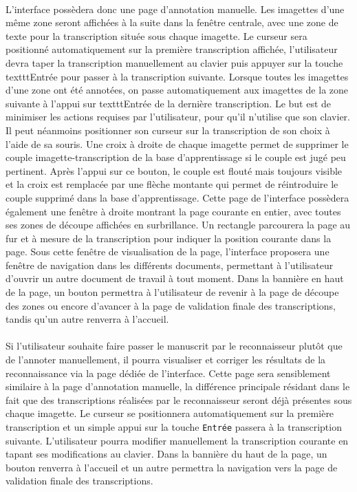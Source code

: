 \paragraph{}
L’interface possèdera donc une page d’annotation manuelle. Les imagettes d’une même zone seront affichées à la suite dans la fenêtre centrale, avec une zone de texte pour la transcription située sous chaque imagette. Le curseur sera positionné automatiquement sur la première transcription affichée, l’utilisateur devra taper la transcription manuellement au clavier puis appuyer sur la touche texttt{Entrée} pour passer à la transcription suivante. Lorsque toutes les imagettes d’une zone ont été annotées, on passe automatiquement aux imagettes de la zone suivante à l’appui sur texttt{Entrée} de la dernière transcription. Le but est de minimiser les actions requises par l’utilisateur, pour qu’il n’utilise que son clavier. Il peut néanmoins positionner son curseur sur la transcription de son choix à l’aide de sa souris.
Une croix à droite de chaque imagette permet de supprimer le couple imagette-transcription de la base d’apprentissage si le couple est jugé peu pertinent. Après l’appui sur ce bouton, le couple est flouté mais toujours visible et la croix est remplacée par une flèche montante qui permet de réintroduire le couple supprimé dans la base d’apprentissage.
Cette page de l’interface possèdera également une fenêtre à droite montrant la page courante en entier, avec toutes ses zones de découpe affichées en surbrillance. Un rectangle parcourera la page au fur et à mesure de la transcription pour indiquer la position courante dans la page.
Sous cette fenêtre de visualisation de la page, l’interface proposera une fenêtre de navigation dans les différents documents, permettant à l’utilisateur d’ouvrir un autre document de travail à tout moment.
Dans la bannière en haut de la page, un bouton permettra à l’utilisateur de revenir à la page de découpe des zones ou encore d’avancer à la page de validation finale des transcriptions, tandis qu’un autre renverra à l’accueil.


\paragraph{}
Si l’utilisateur souhaite faire passer le manuscrit par le reconnaisseur plutôt que de l’annoter manuellement, il pourra visualiser et corriger les résultats de la reconnaissance via la page dédiée de l’interface. Cette page sera sensiblement similaire à la page d’annotation manuelle, la différence principale résidant dans le fait que des transcriptions réalisées par le reconnaisseur seront déjà présentes sous chaque imagette. Le curseur se positionnera automatiquement sur la première transcription et un simple appui sur la touche \texttt{Entrée} passera à la transcription suivante. L’utilisateur pourra modifier manuellement la transcription courante en tapant ses modifications au clavier.
Dans la bannière du haut de la page, un bouton renverra à l’accueil et un autre permettra la navigation vers la page de validation finale des transcriptions.

